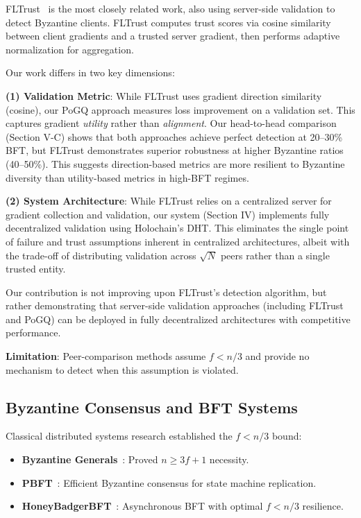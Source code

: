 FLTrust~\cite{cao2021fltrust} is the most closely related work, also using server-side validation to detect Byzantine clients. FLTrust computes trust scores via cosine similarity between client gradients and a trusted server gradient, then performs adaptive normalization for aggregation.

Our work differs in two key dimensions:

\textbf{(1) Validation Metric}: While FLTrust uses gradient direction similarity (cosine), our PoGQ approach measures loss improvement on a validation set. This captures gradient \emph{utility} rather than \emph{alignment}. Our head-to-head comparison (Section V-C) shows that both approaches achieve perfect detection at 20--30\% BFT, but FLTrust demonstrates superior robustness at higher Byzantine ratios (40--50\%). This suggests direction-based metrics are more resilient to Byzantine diversity than utility-based metrics in high-BFT regimes.

\textbf{(2) System Architecture}: While FLTrust relies on a centralized server for gradient collection and validation, our system (Section IV) implements fully decentralized validation using Holochain's DHT. This eliminates the single point of failure and trust assumptions inherent in centralized architectures, albeit with the trade-off of distributing validation across $\sqrt{N}$ peers rather than a single trusted entity.

Our contribution is not improving upon FLTrust's detection algorithm, but rather demonstrating that server-side validation approaches (including FLTrust and PoGQ) can be deployed in fully decentralized architectures with competitive performance.

\textbf{Limitation}: Peer-comparison methods assume $f < n/3$ and provide no mechanism to detect when this assumption is violated.

\subsection{Byzantine Consensus and BFT Systems}

Classical distributed systems research established the $f < n/3$ bound:

\begin{itemize}
    \item \textbf{Byzantine Generals}~\cite{lamport1982byzantine}: Proved $n \geq 3f+1$ necessity.
    \item \textbf{PBFT}~\cite{castro1999practical}: Efficient Byzantine consensus for state machine replication.
    \item \textbf{HoneyBadgerBFT}~\cite{miller2016honey}: Asynchronous BFT with optimal $f < n/3$ resilience.
\end{itemize}

